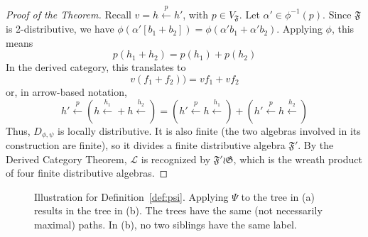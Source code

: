 \documentclass[sigplan,9pt]{acmart}\settopmatter{printfolios=true,printccs=false,printacmref=false}
\theoremstyle{definition}
\newcommand{\La}[0]{{\mathcal{L}}}
\newcommand{\Ff}[0]{{\mathfrak{F}}}
\newcommand{\Gg}[0]{{\mathfrak{G}}}
\newcommand{\carrow}[3]{#3 \xleftarrow{#2} #1 }
\begin{document}
\begin{proof}[Proof of the Theorem]
Recall $v = \carrow{h}{p} h'$, with $p \in V_\Ff$.
Let $\alpha' \in \phi^{-1}(p)$.
Since $\Ff$ is 2-distributive, we have $\phi(\alpha'[b_1+b_2]) = \phi(\alpha' b_1 + \alpha' b_2)$.
Applying $\phi$, this means $$p(h_1+h_2) = p(h_1) + p(h_2)$$
In the derived category, this translates to $$v (f_1 + f_2)) = v f_1 + v f_2$$
or, in arrow-based notation,
$$\carrow{\left(\carrow{}{h_1}h + \carrow{}{h_2}h\right)}{p}{h'} = \left( \carrow{\carrow{}{h_1}h}{p}{h'}\right) + \left( \carrow{\carrow{}{h_2}h}{p}{h'}\right)$$
Thus, $D_{\phi,\psi}$ is locally distributive.
It is also finite (the two algebras involved in its construction are finite), so it divides a finite distributive algebra $\Ff'$.
By the Derived Category Theorem, $\La$ is recognized by $\Ff' \wr \Gg$, which is the wreath product of four finite distributive algebras.
\end{proof}



\begin{figure}
\begin{subfigure}[b]{0.4\textwidth}
\begin{center}
\end{center}
\caption{}
\end{subfigure}
%
%
\begin{subfigure}[b]{0.4\textwidth}
\begin{center}
\end{center}
\caption{}
\end{subfigure}
%
\caption{Illustration for Definition~\ref{def:psi}. Applying $\Psi$ to the tree in (a) results in the tree in (b). The trees have the same (not necessarily maximal) paths. In (b), no two siblings have the same label.}\label{fig:psi}%
\end{figure}
\end{document}
